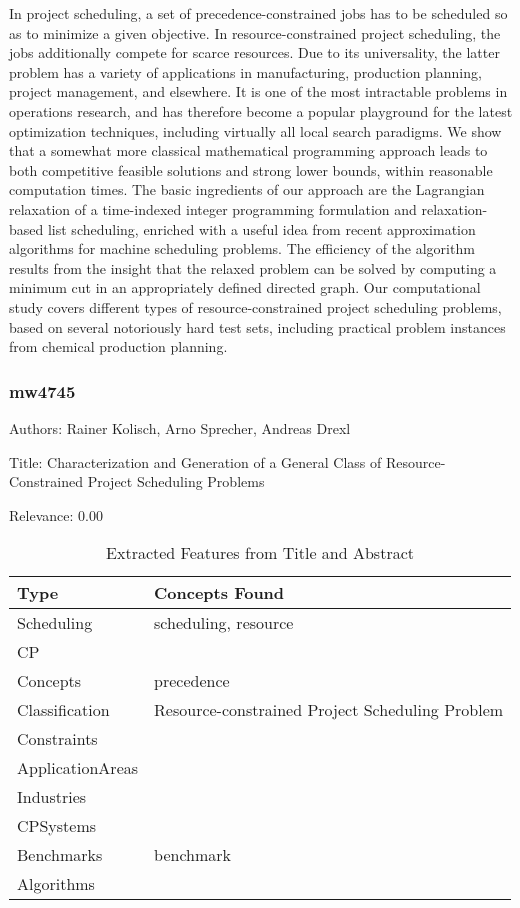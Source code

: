   In project scheduling, a set of precedence-constrained jobs has to be scheduled so as to minimize a given objective. In resource-constrained project scheduling, the jobs additionally compete for scarce resources. Due to its universality, the latter problem has a variety of applications in manufacturing, production planning, project management, and elsewhere. It is one of the most intractable problems in operations research, and has therefore become a popular playground for the latest optimization techniques, including virtually all local search paradigms. We show that a somewhat more classical mathematical programming approach leads to both competitive feasible solutions and strong lower bounds, within reasonable computation times. The basic ingredients of our approach are the Lagrangian relaxation of a time-indexed integer programming formulation and relaxation-based list scheduling, enriched with a useful idea from recent approximation algorithms for machine scheduling problems. The efficiency of the algorithm results from the insight that the relaxed problem can be solved by computing a minimum cut in an appropriately defined directed graph. Our computational study covers different types of resource-constrained project scheduling problems, based on several notoriously hard test sets, including practical problem instances from chemical production planning.  

\subsubsection{mw4745}
\label{mw:mw4745}

Authors: Rainer Kolisch, Arno Sprecher, Andreas Drexl

Title: Characterization and Generation of a General Class of Resource-Constrained Project Scheduling Problems

Relevance:  0.00

{\scriptsize
\begin{longtable}{p{2cm}p{20cm}}
\caption{Extracted Features from Title and Abstract}\\ \toprule
Type & Concepts Found\\ \midrule
\endhead
\bottomrule
\endfoot
Scheduling & scheduling, resource\\ 
CP & \\ 
Concepts & precedence\\ 
Classification & Resource-constrained Project Scheduling Problem\\ 
Constraints & \\ 
ApplicationAreas & \\ 
Industries & \\ 
CPSystems & \\ 
Benchmarks & benchmark\\ 
Algorithms & \\ 
\end{longtable}
}


